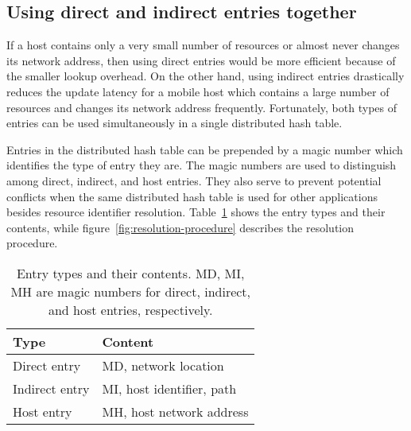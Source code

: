 \documentclass{article}
\begin{document}
\subsection{Using direct and indirect entries together}
\label{sec:concurrent-use}

If a host contains only a very small number of resources or almost
never changes its network address, then using direct entries would be
more efficient because of the smaller lookup overhead.  On the other
hand, using indirect entries drastically reduces the update latency
for a mobile host which contains a large number of resources and changes
its network address frequently.  Fortunately, both types of entries
can be used simultaneously in a single distributed hash table.

Entries in the distributed hash table can be prepended by a magic
number which identifies the type of entry they are.  The magic numbers
are used to distinguish among direct, indirect, and host entries.
They also serve to prevent potential conflicts when the same
distributed hash table is used for other applications besides resource
identifier resolution.  Table~\ref{tab:entries} shows the entry types
and their contents, while figure~\ref{fig:resolution-procedure}
describes the resolution procedure.

\begin{table}
  \centering
  \begin{tabular}{l|l}
    Type & Content \\
    \hline
    Direct entry & MD, network location \\
    Indirect entry & MI, host identifier, path \\
    Host entry & MH, host network address
  \end{tabular}
  \caption{Entry types and their contents.  MD, MI, MH are magic
    numbers for direct, indirect, and host entries, respectively.}
  \label{tab:entries}
\end{table}
\end{document}
